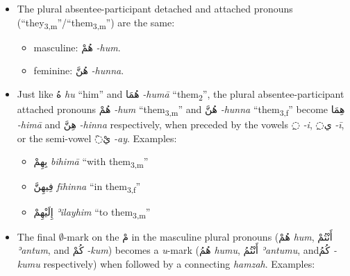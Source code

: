 \documentclass[
  10pt,
]{book}
\providecommand{\tightlist}{%
  \setlength{\itemsep}{0pt}\setlength{\parskip}{0pt}}
\begin{document}
\begin{itemize}
\tightlist
\item
  The plural absentee-participant detached and attached pronouns (\enquote{they\textsubscript{3,m}}/\enquote{them\textsubscript{3,m}}) are the same:

  \begin{itemize}
  \tightlist
  \item
    masculine: \foreignlanguage{arabic}{هُمْ} \emph{-hum}.
  \item
    feminine: \foreignlanguage{arabic}{هُنَّ} \emph{-hunna}.
  \end{itemize}
\item
  Just like \foreignlanguage{arabic}{هُ} \emph{hu} \enquote{him} and \foreignlanguage{arabic}{هُمَا} \emph{-humā} \enquote{them\textsubscript{2}}, the plural absentee-participant attached pronouns
  \foreignlanguage{arabic}{هُمْ} \emph{-hum} \enquote{them\textsubscript{3,m}} and
  \foreignlanguage{arabic}{هُنَّ} \emph{-hunna} \enquote{them\textsubscript{3,f}}
  become \foreignlanguage{arabic}{هِمَا} \emph{-himā} and \foreignlanguage{arabic}{هِنَّ} \emph{-hinna} respectively, when preceded by the vowels \foreignlanguage{arabic}{◌ِ} \emph{-i}, \foreignlanguage{arabic}{◌ِي} \emph{-ī}, or the semi-vowel \foreignlanguage{arabic}{◌َيْ} \emph{-ay}. Examples:

  \begin{itemize}
  \tightlist
  \item
    \foreignlanguage{arabic}{بِهِمْ} \emph{bihimā} \enquote{with them\textsubscript{3,m}}
  \item
    \foreignlanguage{arabic}{فِيهِنَّ} \emph{fīhinna} \enquote{in them\textsubscript{3,f}}
  \item
    \foreignlanguage{arabic}{إِلَيْهِمْ} \emph{ʾilayhim} \enquote{to them\textsubscript{3,m}}
  \end{itemize}
\item
  The final \(\emptyset\)-mark on the \foreignlanguage{arabic}{مْ} in the masculine plural pronouns (\foreignlanguage{arabic}{هُمْ} \emph{hum}, \foreignlanguage{arabic}{أَنْتُمْ} \emph{ʾantum}, and \foreignlanguage{arabic}{کُمْ} \emph{-kum}) becomes a \emph{u}-mark (\foreignlanguage{arabic}{هُمُ} \emph{humu}, \foreignlanguage{arabic}{أَنْتُمُ} \emph{ʾantumu}, and\foreignlanguage{arabic}{کُمُ} \emph{-kumu} respectively) when followed by a connecting \emph{hamzah}. Examples:


\end{itemize}
\end{document}
